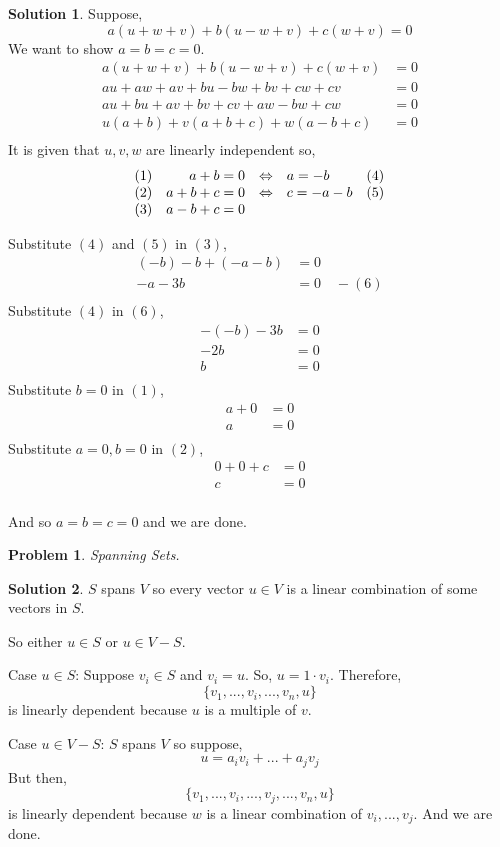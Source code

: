 \documentclass{article}
\newtheorem{problem}{Problem}
\theoremstyle{definition}
\newtheorem*{solution}{Solution}
\begin{document}
\begin{solution}

Suppose,
\[a(u+w+v)+b(u-w+v)+c(w+v)=0\]
We want to show $a=b=c=0$.
\begin{align*}
a(u+w+v)+b(u-w+v)+c(w+v)&=0\\
au+aw+av+bu-bw+bv+cw+cv&=0\\
au+bu+av+bv+cv+aw-bw+cw&=0\\
u(a+b)+v(a+b+c)+w(a-b+c)&=0\\
\end{align*}
It is given that $u,v,w$ are linearly independent so,
\[\begin{array}{r r c l l}
(1) & a+b=0 & \Leftrightarrow & a=-b & (4)\\
(2) & a+b+c=0 & \Leftrightarrow & c=-a-b & (5)\\
(3) & a-b+c=0\\
\end{array}\]
\begin{multicols}{2}
Substitute $(4)$ and $(5)$ in $(3)$,
\begin{align*}
(-b)-b+(-a-b)&=0\\
-a-3b&=0 \quad -(6)\\
\end{align*}
Substitute $(4)$ in $(6)$,
\begin{align*}
-(-b)-3b&=0\\
-2b&=0\\
b&=0\\
\end{align*}
Substitute $b=0$ in $(1)$,
\begin{align*}
a+0&=0\\
a&=0\\
\end{align*}
Substitute $a=0, b=0$ in $(2)$,
\begin{align*}
0+0+c&=0\\
c&=0\\
\end{align*}
\end{multicols}
And so $a=b=c=0$ and we are done.

\end{solution}

\begin{problem}

Spanning Sets.

\end{problem}

\begin{solution}

$S$ spans $V$ so every vector $u\in V$ is a linear combination of some vectors in $S$.

So either $u\in S$ or $u\in V-S$.

Case $u\in S$:
Suppose $v_i\in S$ and $v_i=u$.
So, $u=1\cdot v_i$.
Therefore,
\[\{v_1,...,v_i,...,v_n,u\}\]
is linearly dependent because $u$ is a multiple of $v$.

Case $u\in V-S$:
$S$ spans $V$ so suppose,
\[u=a_iv_i+...+a_jv_j\]
But then,
\[\{v_1,...,v_i,...,v_j,...,v_n,u\}\]
is linearly dependent because $w$ is a linear combination of $v_i,...,v_j$.
And we are done.

\end{solution}
\end{document}
